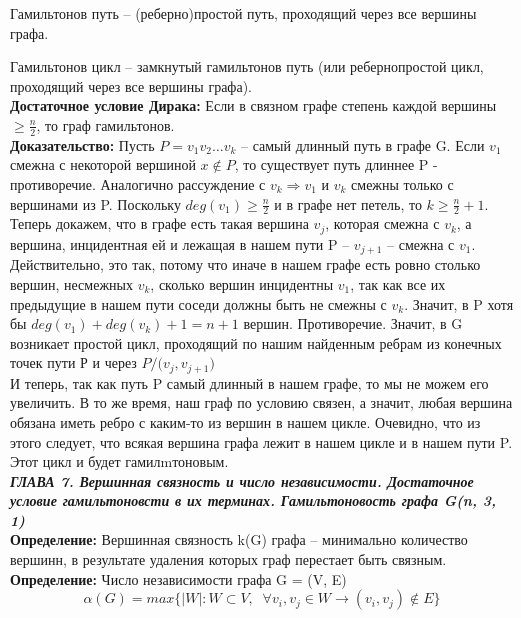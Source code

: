 \documentclass[12pt]{article}
\begin{document}
Гамильтонов путь -- (реберно)простой путь, проходящий через все вершины графа. 

Гамильтонов цикл -- замкнутый гамильтонов путь (или ребернопростой цикл, проходящий через все вершины графа).\\

\textbf{Достаточное условие Дирака:} Если в связном графе степень каждой вершины \(\geq \frac{n}{2}\), то граф гамильтонов.\\

\textbf{Доказательство:} Пусть \(\mathit{P = v_1
v_2 \dots v_k}\) -- самый длинный путь в графе G. Если \(\mathit{v_1}\) смежна с некоторой вершиной \(\mathit{x \notin P}\), то существует путь длиннее P - противоречие. Аналогично рассуждение с \(\mathit{v_k \Rightarrow v_1}\) и \(\mathit{v_k}\) смежны только с вершинами из P. Поскольку \(\mathit{deg(v_1) \geq \frac{n}{2}}\) и в графе нет петель, то \(\mathit{k \geq \frac{n}{2} + 1}\).  \\

Теперь докажем, что в графе есть такая вершина \(v_j\), которая смежна с \(v_k\), а вершина, инцидентная ей и лежащая в нашем пути P -- \(v_{j+1}\) -- смежна с \(v_{1}\). Действительно, это так, потому что иначе в нашем графе есть ровно столько вершин, несмежных \(v_{k}\), сколько вершин инцидентны \(v_{1}\), так как все их предыдущие в нашем пути соседи должны быть не смежны с \(v_{k}\). Значит, в P хотя бы \(deg(v_{1}) + deg(v_k) + 1 = n + 1\) вершин. Противоречие. Значит, в G возникает простой цикл, проходящий по нашим найденным ребрам из конечных точек пути Р и через \(P/{(v_j, v_{j+1}})\) \\

И теперь, так как путь P самый длинный в нашем графе, то мы не можем его увеличить. В то же время, наш граф по условию связен, а значит, любая вершина обязана иметь ребро с каким-то из вершин в нашем цикле. Очевидно, что из этого следует, что всякая вершина графа лежит в нашем цикле и в нашем пути P. Этот цикл и будет гамилmтоновым.
\newpage
\\
\textbf{\textit{ГЛАВА 7. Вершинная связность и число независимости. Достаточное условие гамильтоновсти в их терминах. Гамильтоновость графа G(n, 3, 1)}}
\\

\textbf{Определение:} Вершинная связность k(G) графа -- минимально количество вершинн, в результате удаления которых граф перестает быть связным.\\


\textbf{Определение:} Число независимости графа G = (V, E) $$\alpha(G) = max\{|W|: W \subset V, \;\;\forall v_i, v_j \in W \xrightarrow[]{} (v_i, v_j) \notin E \}$$ \\
\end{document}
